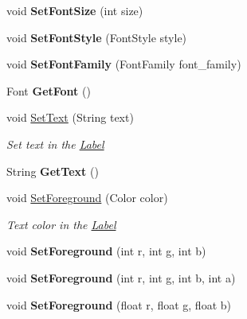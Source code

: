 \begin{DoxyCompactItemize}
void {\bfseries Set\+Font\+Size} (int size)
\item 
\mbox{\label{class_space_v_i_l_1_1_label_a178c4e09dd98094f4d31756d6bd2fc2c}} 
void {\bfseries Set\+Font\+Style} (Font\+Style style)
\item 
\mbox{\label{class_space_v_i_l_1_1_label_a42159d774895d026aac0168dc6b8e511}} 
void {\bfseries Set\+Font\+Family} (Font\+Family font\+\_\+family)
\item 
\mbox{\label{class_space_v_i_l_1_1_label_a40a4bfe482dd908f4ae7261d9ef4d0f8}} 
Font {\bfseries Get\+Font} ()
\item 
void \mbox{\hyperlink{class_space_v_i_l_1_1_label_a7f6a0dc0e3f9b9a00140f099ff81f8db}{Set\+Text}} (String text)
\begin{DoxyCompactList}\small\item\em Set text in the \mbox{\hyperlink{class_space_v_i_l_1_1_label}{Label}} \end{DoxyCompactList}\item 
\mbox{\label{class_space_v_i_l_1_1_label_a40929dbc0738f76517783ed79b1d6fbb}} 
String {\bfseries Get\+Text} ()
\item 
void \mbox{\hyperlink{class_space_v_i_l_1_1_label_a0e188eabb84af83b0bedf3c59c08273b}{Set\+Foreground}} (Color color)
\begin{DoxyCompactList}\small\item\em Text color in the \mbox{\hyperlink{class_space_v_i_l_1_1_label}{Label}} \end{DoxyCompactList}\item 
\mbox{\label{class_space_v_i_l_1_1_label_a73d589aa1aece14c95e35e2257ab7646}} 
void {\bfseries Set\+Foreground} (int r, int g, int b)
\item 
\mbox{\label{class_space_v_i_l_1_1_label_aa1b7740b3ec88243557afeed8cdc8e77}} 
void {\bfseries Set\+Foreground} (int r, int g, int b, int a)
\item 
\mbox{\label{class_space_v_i_l_1_1_label_a362daa577d29d00ef7354a3d46300aab}} 
void {\bfseries Set\+Foreground} (float r, float g, float b)

\end{DoxyCompactItemize}
